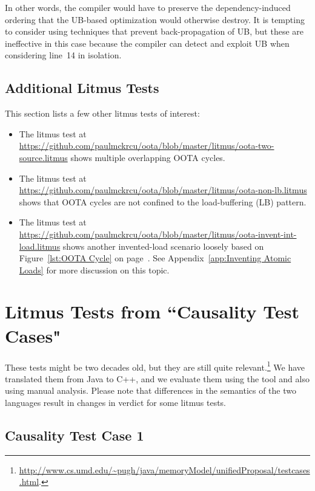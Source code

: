 \documentclass[10]{article}
\begin{document}
In other words, the compiler would have to preserve the dependency-induced
ordering that the UB-based optimization would otherwise destroy.
It is tempting to consider using techniques
that prevent back-propagation of UB, but these are ineffective in this
case because the compiler can detect and exploit UB when
considering line~14 in isolation.

\subsection{Additional Litmus Tests}
\label{app:Additional Litmus Tests}

This section lists a few other litmus tests of interest:

\begin{itemize}
\item	The litmus test at
	\url{https://github.com/paulmckrcu/oota/blob/master/litmus/oota-two-source.litmus}
	shows multiple overlapping OOTA cycles.
\item	The litmus test at
	\url{https://github.com/paulmckrcu/oota/blob/master/litmus/oota-non-lb.litmus}
	shows that OOTA cycles are not confined to the load-buffering (LB)
	pattern.
\item	The litmus test at
	\url{https://github.com/paulmckrcu/oota/blob/master/litmus/oota-invent-int-load.litmus}
	shows another invented-load scenario loosely based on
	Figure~\ref{lst:OOTA Cycle}
	on
	page~\pageref{lst:OOTA Cycle}.
	See Appendix~\ref{app:Inventing Atomic Loads}
	for more discussion on this topic.
\end{itemize}

\clearpage

\section{Litmus Tests from “Causality Test Cases"}
\label{app:Litmus Tests from “Causality Test Cases"}

These tests might be two decades old, but they are still quite
relevant.\footnote{
	\url{http://www.cs.umd.edu/~pugh/java/memoryModel/unifiedProposal/testcases.html}.}
We have translated them from Java to C++, and we evaluate them using
the  tool and also using manual analysis.
Please note that differences in the semantics of the two languages
result in changes in verdict for some litmus tests.

\subsection{Causality Test Case 1}
\label{app:Causality Test Case 1}
\end{document}
